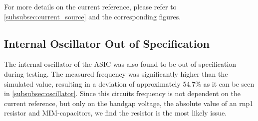 For more details on the current reference, please refer to \autoref{subsubsec:current_source} and the corresponding figures.

\subsection{Internal Oscillator Out of Specification}
The internal oscillator of the \ac{ASIC} was also found to be out of specification during testing. The measured frequency was significantly higher than the simulated value, resulting in a deviation of approximately 54.7\% as it can be seen in \autoref{subsubsec:oscillator}. Since this circuits frequency is not dependent on the current reference, but only on the bandgap voltage, the absolute value of an rnp1 resistor and MIM-capacitors, we find the resistor is the most likely issue. 
